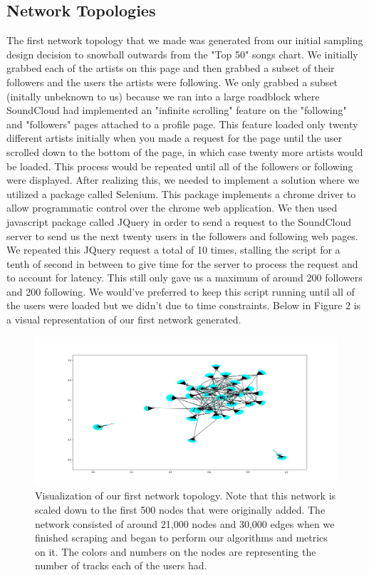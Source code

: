 \documentclass{article}
\begin{document}
\subsection{Network Topologies}
The first network topology that we made was generated from our initial sampling design decision to snowball outwards from the "Top 50" songs chart.  We initially grabbed each of the artists on this page and then grabbed a subset of their followers and the users the artists were following.  We only grabbed a subset (initally unbeknown to us) because we ran into a large roadblock where SoundCloud had implemented an "infinite scrolling" feature on the "following" and "followers" pages attached to a profile page.  This feature loaded only twenty different artists initially when you made a request for the page until the user scrolled down to the bottom of the page, in which case twenty more artists would be loaded.  This process would be repeated until all of the followers or following were displayed.  After realizing this, we needed to implement a solution where we utilized a package called Selenium. This package implements a chrome driver to allow programmatic control over the chrome web application.  We then used javascript package called JQuery in order to send a request to the SoundCloud server to send us the next twenty users in the followers and following web pages.  We repeated this JQuery request a total of 10 times, stalling the script for a tenth of second in between to give time for the server to process the request and to account for latency.  This still only gave us a maximum of around 200 followers and 200 following.  We would've preferred to keep this script running until all of the users were loaded but we didn't due to time constraints.  Below in Figure 2 is a visual representation of our first network generated. 

\begin{figure}[h]
	\centering
	\includegraphics[scale=0.29]{take_1_visualization}
	\caption{Visualization of our first network topology.  Note that this network is scaled down to the first 500 nodes that were originally added.  The network consisted of around 21,000 nodes and 30,000 edges when we finished scraping and began to perform our algorithms and metrics on it.  The colors and numbers on the nodes are representing the number of tracks each of the users had.}
\end{figure}
\end{document}
